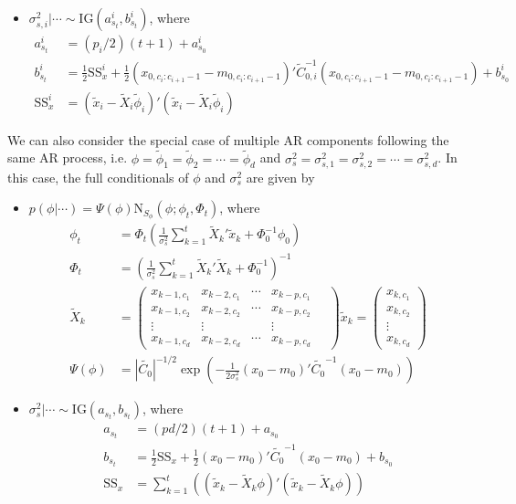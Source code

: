 \documentclass{article}
\begin{document}
\begin{itemize}
\item $\sigma^2_{s,i}|\cdots \sim \mbox{IG}(a^i_{s_t}, b^i_{s_t})$, where
\begin{align*}
a^i_{s_t} &= (p_i/2)(t+1) + a^i_{s_0} \\
b^i_{s_t} &= \frac{1}{2}\mbox{SS}^i_x + \frac{1}{2}(x_{0,c_i:c_{i+1}-1}-m_{0,c_i:c_{i+1}-1})'\tilde{C}_{0,i}^{-1}(x_{0,c_i:c_{i+1}-1}-m_{0,c_i:c_{i+1}-1}) + b^i_{s_0} \\
\mbox{SS}^i_x &= (\tilde{x}_i - \tilde{X}_i\tilde{\phi}_i)'(\tilde{x}_i - \tilde{X}_i\tilde{\phi}_i)
\end{align*}
\end{itemize}

\noindent We can also consider the special case of multiple AR components following the same AR process, i.e. $\phi = \tilde{\phi}_1 = \tilde{\phi}_2 = \cdots = \tilde{\phi}_d$ and $\sigma^2_s = \sigma^2_{s,1} = \sigma^2_{s,2} = \cdots = \sigma^2_{s,d}$. In this case, the full conditionals of $\phi$ and $\sigma^2_s$ are given by
\begin{itemize}
\item $p(\phi|\cdots) = \Psi(\phi)\mbox{N}_{S_\phi}(\phi; \phi_t,\Phi_t)$, where
\begin{align*}
\phi_t &= \Phi_t\left(\frac{1}{\sigma^2_s} \sum_{k=1}^t \tilde{X}_k'\tilde{x}_k + \Phi_0^{-1}\phi_0\right) \\
\Phi_t &= \left(\frac{1}{\sigma^2_s} \sum_{k=1}^t \tilde{X}_k'\tilde{X}_k + \Phi_0^{-1}\right)^{-1} \\
\tilde{X}_k &= \left(\begin{array}{ccccc}
x_{k-1,c_1} & x_{k-2,c_1} & \cdots & x_{k-p,c_1} \\
x_{k-1,c_2} & x_{k-2,c_2} & \cdots & x_{k-p,c_2} \\
\vdots & \vdots & & \vdots \\
x_{k-1,c_d} & x_{k-2,c_d} & \cdots & x_{k-p,c_d}
\end{array} \quad
\right) \tilde{x}_k = \left(\begin{array}{c} x_{k,c_1} \\ x_{k,c_2} \\ \vdots \\ x_{k,c_d} \end{array}\right) \\
\Psi(\phi) &= \left|\tilde{C_0}\right|^{-1/2}\exp\left(-\frac{1}{2\sigma^2_s}(x_0-m_0)'\tilde{C_0}^{-1}(x_0-m_0)\right)
\end{align*}
\item $\sigma^2_s|\cdots \sim \mbox{IG}(a_{s_t}, b_{s_t})$, where
\begin{align*}
a_{s_t} &= (pd/2)(t+1) + a_{s_0} \\
b_{s_t} &= \frac{1}{2}\mbox{SS}_x + \frac{1}{2}(x_0-m_0)'\tilde{C_0}^{-1}(x_0-m_0) + b_{s_0} \\
\mbox{SS}_x &= \sum_{k=1}^t \left( (\tilde{x}_k - \tilde{X}_k\phi)'(\tilde{x}_k - \tilde{X}_k\phi) \right)
\end{align*}
\end{itemize}
\end{document}
